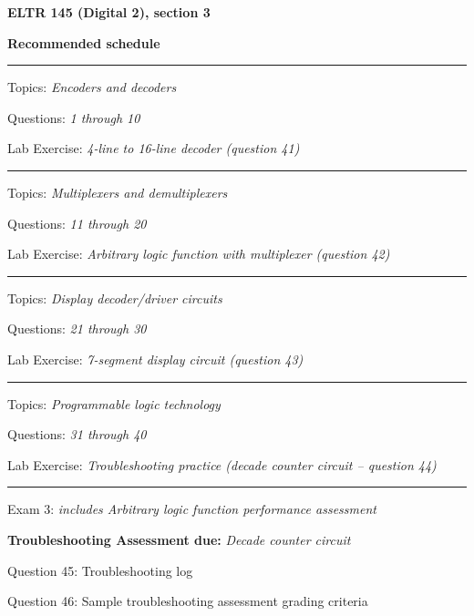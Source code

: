 
\centerline{\bf ELTR 145 (Digital 2), section 3} \bigskip 
 
\vskip 10pt

\noindent
{\bf Recommended schedule}

\vskip 5pt

\hrule \vskip 5pt
\noindent
{}

\hskip 10pt Topics: {\it Encoders and decoders}
 
\hskip 10pt Questions: {\it 1 through 10}
 
\hskip 10pt Lab Exercise: {\it 4-line to 16-line decoder (question 41)}
 
\vskip 10pt
\hrule \vskip 5pt
\noindent
{}

\hskip 10pt Topics: {\it Multiplexers and demultiplexers}
 
\hskip 10pt Questions: {\it 11 through 20}
 
\hskip 10pt Lab Exercise: {\it Arbitrary logic function with multiplexer (question 42)}
 

\vskip 10pt
\hrule \vskip 5pt
\noindent
{}

\hskip 10pt Topics: {\it Display decoder/driver circuits}
 
\hskip 10pt Questions: {\it 21 through 30}
 
\hskip 10pt Lab Exercise: {\it 7-segment display circuit (question 43)}
 
\vskip 10pt
\hrule \vskip 5pt
\noindent
{}

\hskip 10pt Topics: {\it Programmable logic technology}
 
\hskip 10pt Questions: {\it 31 through 40}
 
\hskip 10pt Lab Exercise: {\it Troubleshooting practice (decade counter circuit -- question 44)}
 
\vskip 10pt
\hrule \vskip 5pt
\noindent
{}

\hskip 10pt Exam 3: {\it includes Arbitrary logic function performance assessment}
 
\hskip 10pt {\bf Troubleshooting Assessment due:} {\it Decade counter circuit}
 
\hskip 10pt Question 45: Troubleshooting log
 
\hskip 10pt Question 46: Sample troubleshooting assessment grading criteria
 
